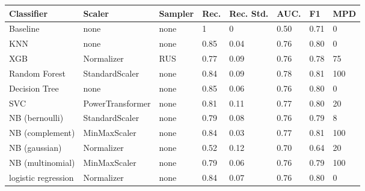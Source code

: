 
\begin{table}[h]

	\begin{footnotesize}
		\begin{tabular}{|l|l|l|l|l|l|l|l|}
			\hline
			\textbf{Classifier} & \textbf{Scaler}  & \textbf{Sampler} & \textbf{Rec.} & \textbf{Rec. Std.} & \textbf{AUC.} & \textbf{F1} & \textbf{MPD} \\ \hline
			Baseline            & none             & none             & 1             & 0                  & 0.50         & 0.71        & 0            \\ \hline
			KNN                 & none             & none             & 0.85          & 0.04               & 0.76         & 0.80        & 0            \\ \hline
			XGB                 & Normalizer       & RUS              & 0.77          & 0.09               & 0.76         & 0.78        & 75           \\ \hline
			Random Forest       & StandardScaler   & none             & 0.84          & 0.09               & 0.78         & 0.81        & 100          \\ \hline
			Decision Tree       & none             & none             & 0.85          & 0.06               & 0.76         & 0.80        & 0            \\ \hline
			SVC                 & PowerTransformer & none             & 0.81          & 0.11               & 0.77         & 0.80        & 20           \\ \hline
			NB (bernoulli)      & StandardScaler   & none             & 0.79          & 0.08               & 0.76         & 0.79        & 8            \\ \hline
			NB (complement)     & MinMaxScaler     & none             & 0.84          & 0.03               & 0.77         & 0.81        & 100          \\ \hline
			NB (gaussian)       & Normalizer       & none             & 0.52          & 0.12               & 0.70         & 0.64        & 20           \\ \hline
			NB (multinomial)    & MinMaxScaler     & none             & 0.79          & 0.06               & 0.76         & 0.79        & 100          \\ \hline
			logistic regression & Normalizer       & none             & 0.84          & 0.07               & 0.76         & 0.80        & 0            \\ \hline
		\end{tabular}


\end{footnotesize}
\end{table}
